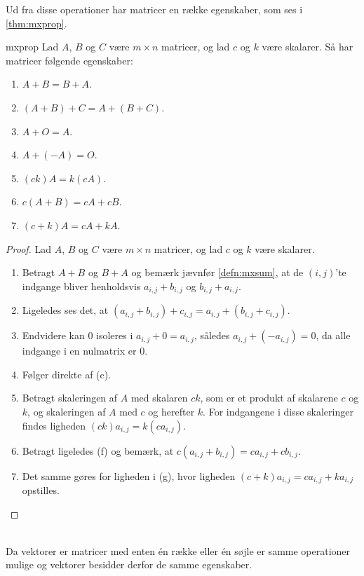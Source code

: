 %
Ud fra disse operationer har matricer en række egenskaber, som ses i \ref{thm:mxprop}.
\begin{thm}{}{mxprop}
Lad $A$, $B$ og $C$ være $m \times n$ matricer, og lad $c$ og $k$ være skalarer.
Så har matricer følgende egenskaber:
\begin{enumerate}[label=(\alph*)]
\item $A + B = B + A$.
\item $(A + B) + C = A + (B + C)$.
\item $A + O = A$.
\item $A + (-A) = O$.
\item $(ck)A = k(cA)$.
\item $c(A + B) = cA + cB$.
\item $(c + k)A = cA + kA$.
\end{enumerate}
\end{thm}
%
\begin{proof}
Lad $A$, $B$ og $C$ være $m \times n$ matricer, og lad $c$ og $k$ være skalarer.
\begin{enumerate}[label=(\alph*)]
\item Betragt $A + B$ og $B + A$ og bemærk jævnfør \ref{defn:mxsum}, at de $(i,j)$'te indgange bliver henholdsvis $a_{i,j} + b_{i,j}$ og $b_{i,j} + a_{i,j}$.
%
\item Ligeledes ses det, at $(a_{i,j} + b_{i,j}) + c_{i,j} = a_{i,j} + (b_{i,j} + c_{i,j})$.
%
\item Endvidere kan $0$ isoleres i $a_{i,j} + 0 = a_{i,j}$, således $a_{i,j} + (-a_{i,j}) = 0$, da alle indgange i en nulmatrix er $0$.
% 
\item Følger direkte af (c).
%
\item Betragt skaleringen af $A$ med skalaren $ck$, som er et produkt af skalarene $c$ og $k$, og skaleringen af $A$ med $c$ og herefter $k$.
For indgangene i disse skaleringer findes ligheden $(ck)a_{i,j} = k(ca_{i,j})$.
%
\item Betragt ligeledes (f) og bemærk, at $c(a_{i,j} + b_{i,j}) = ca_{i,j} + cb_{i,j}$.
%
\item Det samme gøres for ligheden i (g), hvor ligheden $(c + k)a_{i,j} = ca_{i,j} + ka_{i,j}$ opstilles.
\end{enumerate}
\end{proof}
\noindent
\\
%
Da vektorer er matricer med enten én række eller én søjle er samme operationer mulige og vektorer besidder derfor de samme egenskaber.
%
